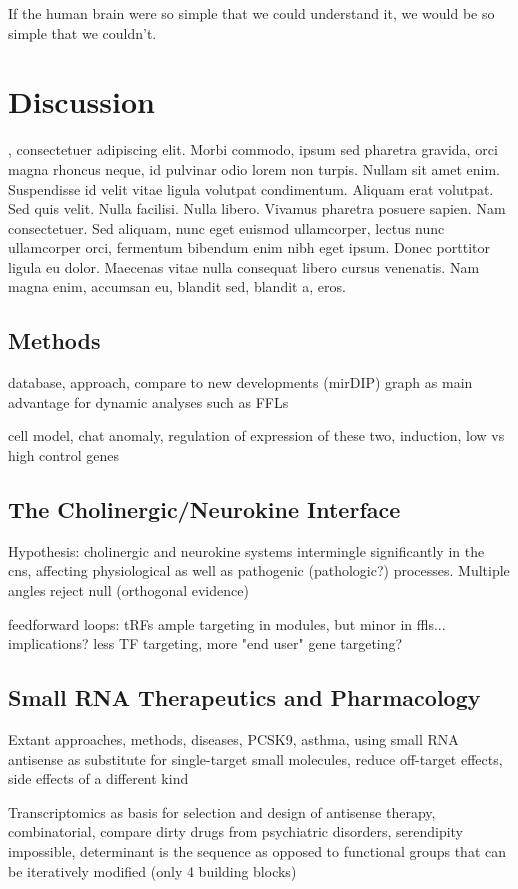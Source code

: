 \begin{savequote}[75mm]
If the human brain were so simple that we could understand it, we would be so simple that we couldn’t.
\end{savequote}

\chapter{Discussion}

, consectetuer adipiscing elit. Morbi commodo, ipsum sed pharetra gravida, orci magna rhoncus neque, id pulvinar odio lorem non turpis. Nullam sit amet enim. Suspendisse id velit vitae ligula volutpat condimentum. Aliquam erat volutpat. Sed quis velit. Nulla facilisi. Nulla libero. Vivamus pharetra posuere sapien. Nam consectetuer. Sed aliquam, nunc eget euismod ullamcorper, lectus nunc ullamcorper orci, fermentum bibendum enim nibh eget ipsum. Donec porttitor ligula eu dolor. Maecenas vitae nulla consequat libero cursus venenatis. Nam magna enim, accumsan eu, blandit sed, blandit a, eros.

\section{Methods} \label{sec:discussion:methods}
database, approach, compare to new developments (mirDIP)
graph as main advantage for dynamic analyses such as FFLs

cell model, chat anomaly, regulation of expression of these two, induction, low vs high control genes


\section{The Cholinergic/Neurokine Interface}
Hypothesis: cholinergic and neurokine systems intermingle significantly in the cns, affecting physiological as well as pathogenic (pathologic?) processes. Multiple angles reject null (orthogonal evidence)

feedforward loops: tRFs ample targeting in modules, but minor in ffls... implications? less TF targeting, more "end user" gene targeting?

\section{Small RNA Therapeutics and Pharmacology} \label{sec:discussion:therapy}
Extant approaches, methods, diseases, PCSK9, asthma, using small RNA antisense as substitute for single-target small molecules, reduce off-target effects, side effects of a different kind

Transcriptomics as basis for selection and design of antisense therapy, combinatorial, compare dirty drugs from psychiatric disorders, serendipity impossible, determinant is the sequence as opposed to functional groups that can be iteratively modified (only 4 building blocks)

